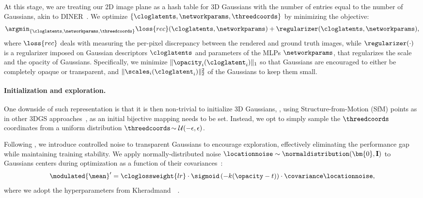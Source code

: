     At this stage, we are treating our 2D image plane as a hash table for 3D Gaussians with the number of entries equal to the number of Gaussians, akin to DINER~\cite{xie2023diner}.
    We optimize $\{\cloglatents,\networkparams,\threedcoords\}$ by minimizing the objective:
    \begin{equation}
      \label{eq:clog-first-stage-objective}
      \argmin_{\{\cloglatents,\networkparams,\threedcoords\}} \loss{rec}(\cloglatents, \networkparams) + \regularizer(\cloglatents, \networkparams),
    \end{equation}
    where $\loss{rec}$ deals with measuring the per-pixel discrepancy between the rendered and ground truth images, while $\regularizer(\cdot)$ is a regularizer imposed on Gaussian descriptors $\cloglatents$ and parameters of the MLPs $\networkparams$,
    that regularizes the scale and the opacity of Gaussians.
    Specifically, we minimize $\|\opacity_i(\cloglatent_i)\|_1$ so that Gaussians
    are encouraged to either be completely opaque or transparent, and
    $\|\scales_i(\cloglatent_i)\|_2^2$ of the Gaussians to keep them small.

    \paragraph{Initialization and exploration.}
      One downside of such representation is that it is then non-trivial to
      initialize 3D Gaussians, \eg, using Structure-from-Motion (SfM) points as in
      other 3DGS
      approaches~\cite{lu2024scaffold,ren2024octree,seo2024flod,taming3dgs2024mallick,kerbl20233d},
      as an initial bijective mapping needs to be set.
      Instead, we opt to simply sample the $\threedcoords$ coordinates from a
      uniform distribution \mbox{$\threedcoords\!
          \sim\mathcal{U}(-\epsilon,\epsilon)$}.

      Following \citet{kheradmand20243d}, we introduce controlled noise to
      transparent Gaussians to encourage exploration, effectively eliminating the
      performance gap while maintaining training stability.
      We apply normally-distributed noise $\locationnoise\sim\normaldistribution(\bm{0}, \textbf{I})$ to Gaussians centers during optimization as a function of their covariances~\cite{kheradmand20243d}:
      \begin{equation}
        \label{eq:clog-noise-loc}
        \modulated{\mean}' = \cloglossweight{lr} \cdot \sigmoid\left(-k(\opacity - t)\right)\cdot \covariance \locationnoise,
      \end{equation}
      where we adopt the hyperparameters from Kheradmand~\etal~\cite{kheradmand20243d}.

